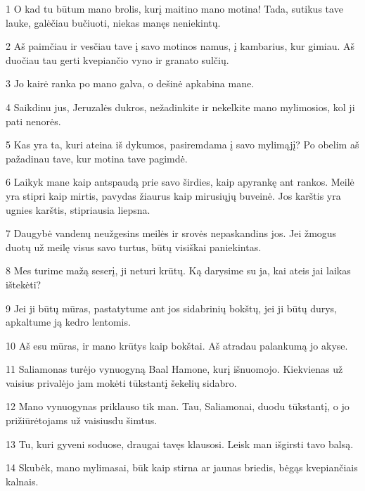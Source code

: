 \par 1 O kad tu būtum mano brolis, kurį maitino mano motina! Tada, sutikus tave lauke, galėčiau bučiuoti, niekas manęs neniekintų. 
\par 2 Aš paimčiau ir vesčiau tave į savo motinos namus, į kambarius, kur gimiau. Aš duočiau tau gerti kvepiančio vyno ir granato sulčių. 
\par 3 Jo kairė ranka po mano galva, o dešinė apkabina mane. 
\par 4 Saikdinu jus, Jeruzalės dukros, nežadinkite ir nekelkite mano mylimosios, kol ji pati nenorės. 
\par 5 Kas yra ta, kuri ateina iš dykumos, pasiremdama į savo mylimąjį? Po obelim aš pažadinau tave, kur motina tave pagimdė. 
\par 6 Laikyk mane kaip antspaudą prie savo širdies, kaip apyrankę ant rankos. Meilė yra stipri kaip mirtis, pavydas žiaurus kaip mirusiųjų buveinė. Jos karštis yra ugnies karštis, stipriausia liepsna. 
\par 7 Daugybė vandenų neužgesins meilės ir srovės nepaskandins jos. Jei žmogus duotų už meilę visus savo turtus, būtų visiškai paniekintas. 
\par 8 Mes turime mažą seserį, ji neturi krūtų. Ką darysime su ja, kai ateis jai laikas ištekėti? 
\par 9 Jei ji būtų mūras, pastatytume ant jos sidabrinių bokštų, jei ji būtų durys, apkaltume ją kedro lentomis. 
\par 10 Aš esu mūras, ir mano krūtys kaip bokštai. Aš atradau palankumą jo akyse. 
\par 11 Saliamonas turėjo vynuogyną Baal Hamone, kurį išnuomojo. Kiekvienas už vaisius privalėjo jam mokėti tūkstantį šekelių sidabro. 
\par 12 Mano vynuogynas priklauso tik man. Tau, Saliamonai, duodu tūkstantį, o jo prižiūrėtojams už vaisius­du šimtus. 
\par 13 Tu, kuri gyveni soduose, draugai tavęs klausosi. Leisk man išgirsti tavo balsą. 
\par 14 Skubėk, mano mylimasai, būk kaip stirna ar jaunas briedis, bėgąs kvepiančiais kalnais.



